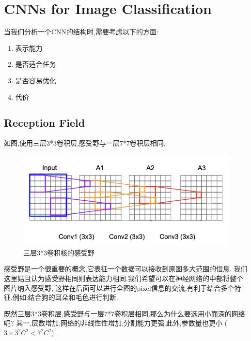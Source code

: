 \section{CNNs for Image Classification}

当我们分析一个CNN的结构时,需要考虑以下的方面:

\begin{enumerate}
	\item 表示能力
	\item 是否适合任务
	\item 是否容易优化
	\item 代价
\end{enumerate}

\subsection{Reception Field}

如图,使用三层3*3卷积层,感受野与一层7*7卷积层相同.

\begin{figure}[htbp]
	\centering
	\includegraphics[scale=0.85]{figures/receptivefield.png}
	\caption{三层3*3卷积核的感受野}
\end{figure}

感受野是一个很重要的概念,它表征一个数据可以接收到原图多大范围的信息.
我们这里姑且认为感受野相同则表达能力相同.我们希望可以在神经网络的中部将整个图片纳入感受野,
这样在后面可以进行全图的pixel信息的交流,有利于结合多个特征.例如:结合狗的耳朵和毛色进行判断.

既然三层3*3卷积层,感受野与一层7*7卷积层相同,那么为什么要选用小而深的网络呢?
其一,层数增加,网络的非线性性增加,分割能力更强.此外,参数量也更小 ($3\times 3^2 C^2 < 7^2C^2$).